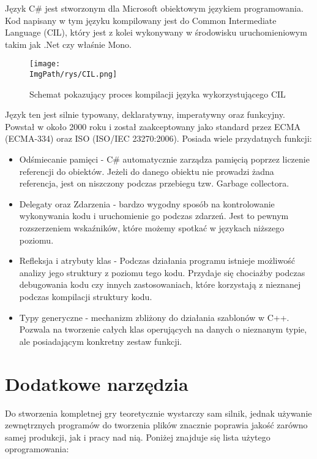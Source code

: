 \documentclass[a4paper,12pt,twoside,openany]{report}
\newcommand{\ImgPath}{.}
\begin{document}
Język C\# jest stworzonym dla Microsoft obiektowym językiem programowania. Kod napisany w tym języku kompilowany jest do Common Intermediate Language (CIL), który jest z kolei wykonywany w środowisku uruchomieniowym  takim jak .Net czy właśnie Mono.  


\begin{figure}[!htbp]
	\begin{center}
\centering
\texttt{[image: \\ImgPath/rys/CIL.png]}
\end{center}
	\caption{Schemat pokazujący proces kompilacji języka wykorzystującego CIL}
	\label{CIL}
\end{figure}

Język ten jest silnie typowany, deklaratywny, imperatywny oraz funkcyjny. Powstał w około 2000 roku i został zaakceptowany jako standard przez ECMA (ECMA-334) oraz ISO (ISO/IEC 23270:2006). Posiada wiele przydatnych funkcji:
\begin{itemize}
    \item Odśmiecanie pamięci - C\# automatycznie zarządza pamięcią poprzez liczenie referencji do obiektów. Jeżeli do danego obiektu nie prowadzi żadna referencja, jest on niszczony podczas przebiegu tzw. Garbage collectora.
    \item Delegaty oraz Zdarzenia - bardzo wygodny sposób na kontrolowanie wykonywania kodu i uruchomienie go podczas zdarzeń. Jest to pewnym rozszerzeniem wskaźników, które możemy spotkać w językach niższego poziomu.
    \item Refleksja i atrybuty klas - Podczas działania programu istnieje możliwość analizy jego struktury z poziomu tego kodu. Przydaje się chociażby podczas debugowania kodu czy innych zastosowaniach, które korzystają z nieznanej podczas kompilacji struktury kodu.
    \item Typy generyczne - mechanizm zbliżony do działania szablonów w C++. Pozwala na tworzenie całych klas operujących na danych o nieznanym typie, ale posiadającym konkretny zestaw funkcji.
\end{itemize}

\section{Dodatkowe narzędzia}
Do stworzenia kompletnej gry teoretycznie wystarczy sam silnik, jednak używanie zewnętrznych programów do tworzenia plików znacznie poprawia jakość zarówno samej produkcji, jak i pracy nad nią. Poniżej znajduje się lista użytego oprogramowania:
\end{document}
